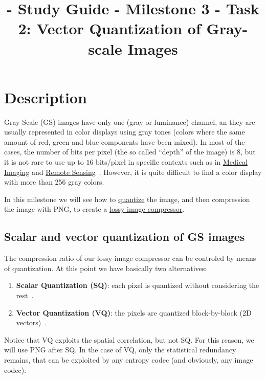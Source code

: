 

\title{\SM{} - Study Guide - Milestone 3 - Task 2: Vector Quantization of Gray-scale Images}

\maketitle
\tableofcontents

\section{Description}

Gray-Scale (GS) images have only one (gray or luminance) channel, an
they are usually represented in color displays using gray tones
(colors where the same amount of red, green and blue components have
been mixed). In most of the cases, the number of bits per pixel (the
so called ``depth'' of the image) is $8$, but it is not rare to use up
to $16$ bits/pixel in specific contexts such as in
\href{https://en.wikipedia.org/wiki/Medical_imaging}{Medical Imaging}
and \href{https://en.wikipedia.org/wiki/Remote_sensing}{Remote
  Sensing}~\cite{burger2016digital}. However, it is quite difficult to
find a color display with more than 256 gray colors.

In this milestone we will see how to
\href{https://vicente-gonzalez-ruiz.github.io/quantization/}{quantize}
the image, and then compression the image with PNG, to create a
\href{https://en.wikipedia.org/wiki/Lossy_compression}{lossy image
  compressor}.

\subsection{Scalar and vector quantization of GS images}

The compression ratio of our lossy image compressor can be controled
by means of quantization. At this point we have basically two
alternatives:
\begin{enumerate}
\item \textbf{Scalar Quantization (SQ)}: each pixel is quantized
  without considering the rest~\cite{vruiz__scalar_quantization}.
\item \textbf{Vector Quantization (VQ)}: the pixels are quantized
  block-by-block (2D vectors)~\cite{vruiz__vector_quantization}.
\end{enumerate}
Notice that VQ exploits the spatial correlation, but not SQ. For this
reason, we will use PNG after SQ. In the case of VQ, only the
statistical redundancy remains, that can be exploited by any entropy
codec (and obviously, any image codec).

